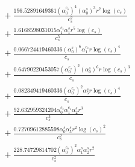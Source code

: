 \documentclass[10pt]{article}
\begin{document}
\begin{align*}
&{}  + \frac{196.52891649361 \left(\alpha_{0}^{c_s}\right)^{4} \left(\alpha_{0}^s\right)^{3} r^{2} \log{\left(c_{s} \right)}}{c_{s}^{2}} \\
&{}  + \frac{1.6168598031015 \alpha_{1}^{c_s} \alpha_{1}^s r^{5} \log{\left(c_{s} \right)}}{c_{s}^{5}} \\
&{}  + \frac{0.066724419460336 \left(\alpha_{0}^s\right)^{6} \alpha_{1}^{c_s} r \log{\left(c_{s} \right)}^{4}}{c_{s}} \\
&{}  + \frac{0.64790220453057 \left(\alpha_{0}^{c_s}\right)^{2} \left(\alpha_{0}^s\right)^{6} r \log{\left(c_{s} \right)}^{3}}{c_{s}} \\
&{}  + \frac{0.082349419460336 \left(\alpha_{0}^{c_s}\right)^{2} \alpha_{5}^s r \log{\left(c_{s} \right)}^{4}}{c_{s}} \\
&{}  + \frac{92.632959324204 \alpha_{0}^{c_s} \alpha_{1}^{c_s} \alpha_{2}^s r^{3}}{c_{s}^{3}} \\
&{}  + \frac{0.72709612885598 \alpha_{0}^s \alpha_{5}^s r^{2} \log{\left(c_{s} \right)}^{2}}{c_{s}^{2}} \\
&{}  + \frac{228.74729814702 \left(\alpha_{0}^{c_s}\right)^{2} \alpha_{1}^s \alpha_{2}^s r^{2}}{c_{s}^{2}}
\end{align*}
\end{document}
